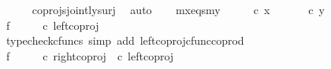 \begin{isabellebody}
\ \ \ \ \isamarkupfalse%
\ coprojs{\isacharunderscore}{\kern0pt}jointly{\isacharunderscore}{\kern0pt}surj\ \isamarkupfalse%
\ auto\isanewline
\isanewline
\ \ \isamarkupfalse%
\ mx{\isacharunderscore}{\kern0pt}eqs{\isacharunderscore}{\kern0pt}my{\isacharcolon}{\kern0pt}\ {\isachardoublequoteopen}{\isasymlangle}{\isasymt}{\isacharcomma}{\kern0pt}{\isasymt}{\isasymrangle}\ {\isasymamalg}\ {\isasymlangle}{\isasymt}{\isacharcomma}{\kern0pt}{\isasymf}{\isasymrangle}\ {\isasymamalg}\ {\isasymlangle}{\isasymf}{\isacharcomma}{\kern0pt}{\isasymt}{\isasymrangle}\ {\isasymcirc}\isactrlsub c\ x\ {\isacharequal}{\kern0pt}\ {\isasymlangle}{\isasymt}{\isacharcomma}{\kern0pt}{\isasymt}{\isasymrangle}\ {\isasymamalg}\ {\isasymlangle}{\isasymt}{\isacharcomma}{\kern0pt}{\isasymf}{\isasymrangle}\ {\isasymamalg}\ {\isasymlangle}{\isasymf}{\isacharcomma}{\kern0pt}{\isasymt}{\isasymrangle}\ {\isasymcirc}\isactrlsub c\ y{\isachardoublequoteclose}\isanewline
\isanewline
\ \ \isamarkupfalse%
\ f{}{\isacharcolon}{\kern0pt}\ {\isachardoublequoteopen}{\isasymlangle}{\isasymt}{\isacharcomma}{\kern0pt}{\isasymt}{\isasymrangle}\ {\isasymamalg}\ {\isasymlangle}{\isasymt}{\isacharcomma}{\kern0pt}{\isasymf}{\isasymrangle}\ {\isasymamalg}\ {\isasymlangle}{\isasymf}{\isacharcomma}{\kern0pt}{\isasymt}{\isasymrangle}\ {\isasymcirc}\isactrlsub c\ left{\isacharunderscore}{\kern0pt}coproj\ {\isasymone}\ {\isacharparenleft}{\kern0pt}{\isasymone}\ {\isasymCoprod}\ {\isasymone}{\isacharparenright}{\kern0pt}\ {\isacharequal}{\kern0pt}\ {\isasymlangle}{\isasymt}{\isacharcomma}{\kern0pt}{\isasymt}{\isasymrangle}{\isachardoublequoteclose}\isanewline
\ \ \ \ \isamarkupfalse%
\ {\isacharparenleft}{\kern0pt}typecheck{\isacharunderscore}{\kern0pt}cfuncs{\isacharcomma}{\kern0pt}\ simp\ add{\isacharcolon}{\kern0pt}\ left{\isacharunderscore}{\kern0pt}coproj{\isacharunderscore}{\kern0pt}cfunc{\isacharunderscore}{\kern0pt}coprod{\isacharparenright}{\kern0pt}\isanewline
\ \ \isamarkupfalse%
\ f{}{\isacharcolon}{\kern0pt}\ {\isachardoublequoteopen}{\isasymlangle}{\isasymt}{\isacharcomma}{\kern0pt}{\isasymt}{\isasymrangle}\ {\isasymamalg}\ {\isasymlangle}{\isasymt}{\isacharcomma}{\kern0pt}{\isasymf}{\isasymrangle}\ {\isasymamalg}\ {\isasymlangle}{\isasymf}{\isacharcomma}{\kern0pt}{\isasymt}{\isasymrangle}\ {\isasymcirc}\isactrlsub c\ {\isacharparenleft}{\kern0pt}right{\isacharunderscore}{\kern0pt}coproj\ {\isasymone}\ {\isacharparenleft}{\kern0pt}{\isasymone}{\isasymCoprod}{\isasymone}{\isacharparenright}{\kern0pt}{\isasymcirc}\isactrlsub c\ left{\isacharunderscore}{\kern0pt}coproj\ {\isasymone}\ {\isasymone}{\isacharparenright}{\kern0pt}\ {\isacharequal}{\kern0pt}\ {\isasymlangle}{\isasymt}{\isacharcomma}{\kern0pt}{\isasymf}{\isasymrangle}{\isachardoublequoteclose}\isanewline

\end{isabellebody}

